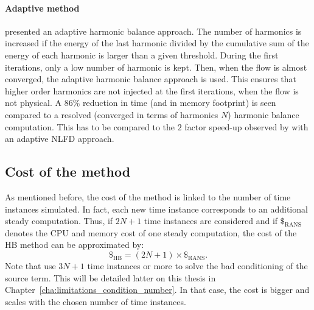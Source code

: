 \paragraph{Adaptive method}
\citet{Maple2004} presented an adaptive harmonic
balance approach. The number of harmonics is increased
if the energy of the last harmonic divided by the cumulative
sum of the energy of each harmonic is larger than a 
given threshold. During the first iterations, only
a low number of harmonic is kept. Then, when the flow
is almost converged, the adaptive harmonic balance
approach is used. This ensures that higher order harmonics
are not injected at the first iterations, when the
flow is not physical. A $86\%$ reduction in time (and
in memory footprint) is seen compared to a resolved (converged in
terms of harmonics $N$) harmonic
balance computation. This has to be compared to
the $2$ factor speed-up observed by \citet{Mosahebi2013}
with an adaptive NLFD approach.

\subsection{Cost of the method}
As mentioned before, the cost of the method is linked to
the number of time instances simulated.
In fact, each new time instance corresponds to an additional steady computation.
Thus, if \mbox{$2N+1$} time instances are considered and if $\mathdollar_{\text{RANS}}$ 
denotes the CPU and memory cost of
one steady computation, the cost of the HB method can be 
approximated by:
\begin{equation}
	\mathdollar_{\text{HB}} = (2N+1) \times \mathdollar_{\text{RANS}}.
\end{equation}
Note that \citet{Ekici2007,Ekici2008a} use $3N+1$
time instances or more to solve the bad conditioning of the
source term. This will be detailed latter on this thesis in 
Chapter~\ref{cha:limitations_condition_number}. In that
case, the cost is bigger and scales with the chosen number
of time instances.